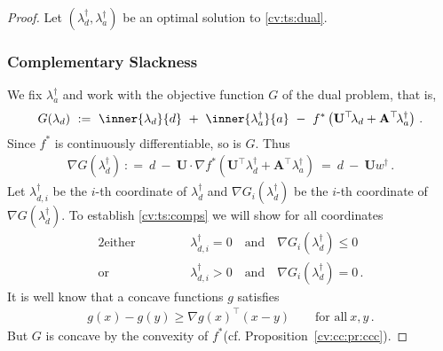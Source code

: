 \begin{proof}
  Let 
$
(\lambda_d^\dagger,\lambda_a^\dagger)
$
be an optimal solution to \eqref{cv:ts:dual}. 

\subsubsection*{Complementary Slackness}
  We fix 
  $
  \lambda_a^\dagger
  $
  and
  work with the objective function $G$ of the dual problem, that is,
  \begin{gather*}
    G
(\lambda_d)
\
:
=
\
    \inner
    {\lambda_d}
    {d}
    \ 
    +
    \ 
    \inner
    {\lambda_a^\dagger}
    {a}
    \ 
    -
    \ 
    f^*
    \left( 
      \mathbf{U}^\top \!\lambda_d
      +
      \mathbf{A}^\top \! \lambda_a^\dagger
    \right)
    \,.
  \end{gather*}
  Since $f^*$ is continuously differentiable, so is $G$.
  Thus
  \begin{gather*}
    \nabla
    G
(\lambda_d^\dagger)
\
:
=
\
d
\ 
    -
    \ 
    \mathbf{U}
    \cdot
    \nabla
    f^*
    \!
    \left( 
      \mathbf{U}^\top \lambda_d^\dagger
      +
      \mathbf{A}^\top  \lambda_a^\dagger
    \right)
    \ 
    =
    \ 
d
\ 
    -
    \ 
    \mathbf{U}
    w^\dagger
    \,.
  \end{gather*}
Let
$\lambda_{d,i}^\dagger$ be the $i$-th coordinate of $\lambda_d^\dagger$ 
and
$
\nabla
G_i
(\lambda_d^\dagger)
$
be the $i$-th coordinate of 
$
\nabla
G
(\lambda_d^\dagger)
$.
  To establish \eqref{cv:ts:comps} we will show
  for all coordinates 
\begin{alignat*}{2}
  \text{either}
  &
  &&
  \qquad
  \lambda_{d,i}^\dagger
  = 0
  \quad
  \text{and}
  \quad
  \nabla
  G
  _i(
  \lambda_{d}^\dagger
  ) \le 0
  \\
  \text{or}
  &
  &&
  \qquad
  \lambda_{d,i}^\dagger
  > 0
  \quad
  \text{and}
  \quad
  \nabla
  G
  _i(
  \lambda_{d}^\dagger
  ) = 0
  \,.
\end{alignat*}
It is well know that a concave functions $g$ satisfies
  \begin{gather}
    \label{cv:ts:concD}
    g(x)-g(y)
    \ge
    \nabla
    g(x)^\top
    (x-y)
    \qquad 
    \text{for all}\ 
    x,y\,.
  \end{gather}
  But $G$ is concave 
  by the convexity of $f^*$(cf. Proposition~\ref{cv:cc:pr:ccc}).


\end{proof}
